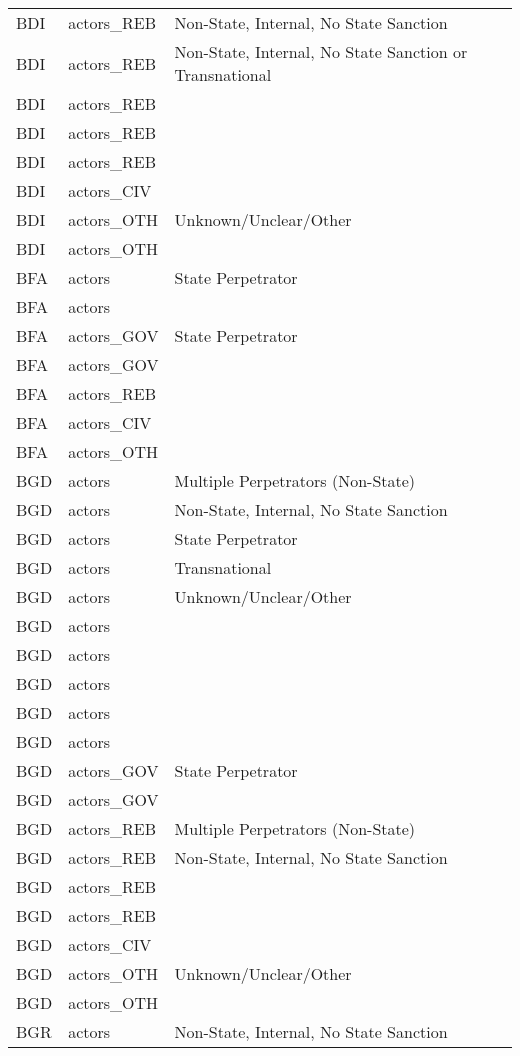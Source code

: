 \begin{table}[ht]
\begin{tabular}{lll}
  BDI & actors\_REB & Non-State, Internal, No State Sanction \\ 
  BDI & actors\_REB & Non-State, Internal, No State Sanction or Transnational \\ 
  BDI & actors\_REB &  \\ 
  BDI & actors\_REB &  \\ 
  BDI & actors\_REB &  \\ 
  BDI & actors\_CIV &  \\ 
  BDI & actors\_OTH & Unknown/Unclear/Other \\ 
  BDI & actors\_OTH &  \\ 
  BFA & actors & State Perpetrator \\ 
  BFA & actors &  \\ 
  BFA & actors\_GOV & State Perpetrator \\ 
  BFA & actors\_GOV &  \\ 
  BFA & actors\_REB &  \\ 
  BFA & actors\_CIV &  \\ 
  BFA & actors\_OTH &  \\ 
  BGD & actors & Multiple Perpetrators (Non-State) \\ 
  BGD & actors & Non-State, Internal, No State Sanction \\ 
  BGD & actors & State Perpetrator \\ 
  BGD & actors & Transnational \\ 
  BGD & actors & Unknown/Unclear/Other \\ 
  BGD & actors &  \\ 
  BGD & actors &  \\ 
  BGD & actors &  \\ 
  BGD & actors &  \\ 
  BGD & actors &  \\ 
  BGD & actors\_GOV & State Perpetrator \\ 
  BGD & actors\_GOV &  \\ 
  BGD & actors\_REB & Multiple Perpetrators (Non-State) \\ 
  BGD & actors\_REB & Non-State, Internal, No State Sanction \\ 
  BGD & actors\_REB &  \\ 
  BGD & actors\_REB &  \\ 
  BGD & actors\_CIV &  \\ 
  BGD & actors\_OTH & Unknown/Unclear/Other \\ 
  BGD & actors\_OTH &  \\ 
  BGR & actors & Non-State, Internal, No State Sanction \\ 

\end{tabular}
\end{table}
